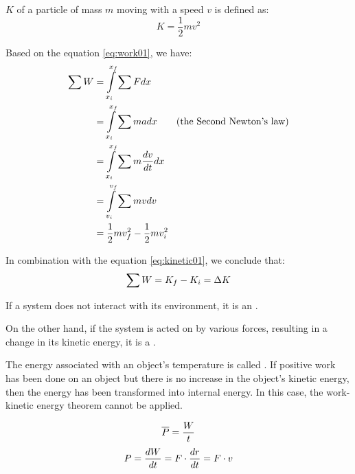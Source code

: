         \par {} $K$ of a particle of mass $m$ moving with a speed $v$ is defined
        as:
        \begin{equation} \label{eq:kinetic01}
            K = \dfrac{1}{2}mv^{2}
        \end{equation}

        \par Based on the equation \eqref{eq:work01}, we have:
        \begin{align*}
            \begin{split}
                \sum W & = {\int\limits _{x_{i}}^{x_{f}} \sum Fdx} \\
                & = {\int\limits _{x_{i}}^{x_{f}} \sum madx} \mbox{\qquad (the Second Newton's law)} \\
                & = {\int\limits _{x_{i}}^{x_{f}} \sum m \dfrac{dv}{dt}dx} \\
                & = {\int\limits _{v_{i}}^{v_{f}} \sum mvdv} \\
                & = \dfrac{1}{2}mv_{f}^{2} - \dfrac{1}{2}mv_{i}^{2} \\
            \end{split}
        \end{align*}
        \par In combination with the equation \eqref{eq:kinetic01}, we conclude that:
        \begin{equation}
            \sum W = K_{f} - K_{i} = \Delta K \\
        \end{equation}

        \par If a system does not interact with its environment, it is an .
        \par On the other hand, if the system is acted on by various forces, resulting in a change
        in its kinetic energy, it is a . 
        \par The energy associated with an object's temperature is called . 
        If positive work has been done on an object but there is no increase in the object's
        kinetic energy, then the energy has been transformed into internal energy. In this case, the
        work-kinetic energy theorem cannot be applied.

            \begin{equation}
                \overline{P} = \dfrac{W}{t}
            \end{equation}
            \begin{equation}
                P = \dfrac{dW}{dt} = F \cdot \dfrac{dr}{dt} = F \cdot v
            \end{equation}